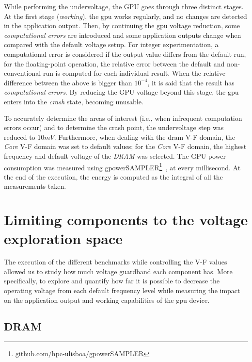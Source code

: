 While performing the undervoltage, the GPU goes through three distinct stages. At the first stage (\textit{working}), the \acrshort{gpu} works regularly, and no changes are detected in the application output. Then, by continuing the \acrshort{gpu} voltage reduction, some \textit{computational errors} are introduced and some application outputs change when compared with the default voltage setup. For integer experimentation, a computational error is considered if the output value differs from the default run, for the floating-point operation, the relative error between the default and non-conventional run is computed for each individual result. When the relative difference between the above is bigger than $10^{-4}$, it is said that the result has \textit{computational errors}.
By reducing the GPU voltage beyond this stage, the \acrshort{gpu} enters into the \textit{crash} state, becoming unusable.

To accurately determine the areas of interest (i.e., when infrequent computation errors occur) and to determine the crash point, the undervoltage step was reduced to $10mV$. Furthermore, when dealing with the \acrshort{dram} V-F domain, the \textit{Core} V-F domain was set to default values; for the \textit{Core} V-F domain, the highest frequency and default voltage of the \textit{DRAM} was selected. The GPU power consumption was measured using gpowerSAMPLER\footnote{github.com/hpc-ulisboa/gpowerSAMPLER}~\cite{guerreiro_gpgpu_2018}, at every millisecond. At the end of the execution, the energy is computed as the integral of all the measurements taken. 

\section{Limiting components to the voltage exploration space}
\label{sec:limiting_components}

The execution of the different benchmarks while controlling the V-F values allowed us to study how much voltage guardband each component has. More specifically, to explore and quantify how far it is possible to decrease the operating voltage from each default frequency level while measuring the impact on the application output and working capabilities of the \acrshort{gpu} device. 


\subsection{DRAM}


